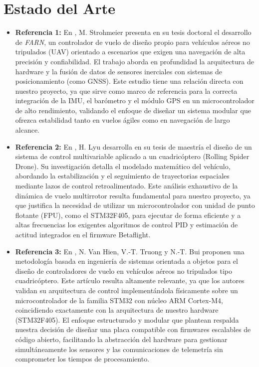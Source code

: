 \documentclass[12pt, letterpaper]{report}
\begin{document}
\tableofcontents
\newpage

\section{Estado del Arte}

\begin{itemize}
    \item \textbf{Referencia 1:} En \cite{ref1}, M. Strohmeier presenta en su tesis doctoral el desarrollo de \textit{FARN}, un controlador de vuelo de diseño propio para vehículos aéreos no tripulados (UAV) orientado a escenarios que exigen una navegación de alta precisión y confiabilidad. El trabajo aborda en profundidad la arquitectura de hardware y la fusión de datos de sensores inerciales con sistemas de posicionamiento (como GNSS). Este estudio tiene una relación directa con nuestro proyecto, ya que sirve como marco de referencia para la correcta integración de la IMU, el barómetro y el módulo GPS en un microcontrolador de alto rendimiento, validando el enfoque de diseñar un sistema modular que ofrezca estabilidad tanto en vuelos ágiles como en navegación de largo alcance.

    \item \textbf{Referencia 2:} En \cite{ref2}, H. Lyu desarrolla en su tesis de maestría el diseño de un sistema de control multivariable aplicado a un cuadricóptero (Rolling Spider Drone). Su investigación detalla el modelado matemático del vehículo, abordando la estabilización y el seguimiento de trayectorias espaciales mediante lazos de control retroalimentado. Este análisis exhaustivo de la dinámica de vuelo multirrotor resulta fundamental para nuestro proyecto, ya que justifica la necesidad de utilizar un microcontrolador con unidad de punto flotante (FPU), como el STM32F405, para ejecutar de forma eficiente y a altas frecuencias los exigentes algoritmos de control PID y estimación de actitud integrados en el firmware Betaflight.

    \item \textbf{Referencia 3:} En \cite{ref3}, N. Van Hien, V.-T. Truong y N.-T. Bui proponen una metodología basada en ingeniería de sistemas orientada a objetos para el diseño de controladores de vuelo en vehículos aéreos no tripulados tipo cuadricóptero. Este artículo resulta altamente relevante, ya que los autores validan su arquitectura de control implementándola físicamente sobre un microcontrolador de la familia STM32 con núcleo ARM Cortex-M4, coincidiendo exactamente con la arquitectura de nuestro hardware (STM32F405). El enfoque estructurado y modular que plantean respalda nuestra decisión de diseñar una placa compatible con firmwares escalables de código abierto, facilitando la abstracción del hardware para gestionar simultáneamente los sensores y las comunicaciones de telemetría sin comprometer los tiempos de procesamiento.


\end{itemize}
\end{document}
